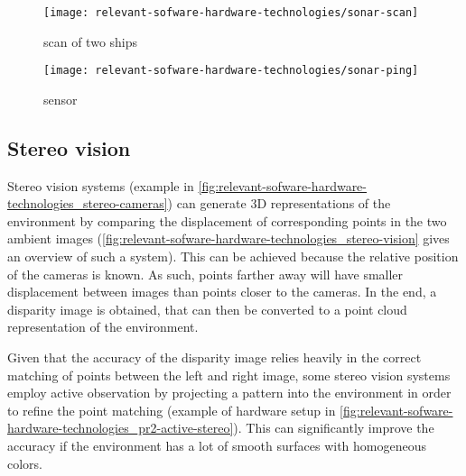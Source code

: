 \begin{savenotes}
\begin{figure}[H]
	\centering
	\begin{minipage}[h]{.47\textwidth}
		\centering
		\texttt{[image: relevant-sofware-hardware-technologies/sonar-scan]}
		\caption[ scan of two ships]{ scan of two ships\protect\footnotemark}
		\label{fig:relevant-sofware-hardware-technologies_sonar-scan}
	\end{minipage}
	\begin{minipage}[h]{.47\textwidth}
		\centering
		\texttt{[image: relevant-sofware-hardware-technologies/sonar-ping]}
		\caption[ sensor]{ sensor\protect\footnotemark}
		\label{fig:relevant-sofware-hardware-technologies_sonar-ping}
	\end{minipage}\hfill
\end{figure}
\end{savenotes}


\subsection{Stereo vision}

Stereo vision systems (example in \cref{fig:relevant-sofware-hardware-technologies_stereo-cameras}) can generate 3D representations of the environment by comparing the displacement of corresponding points in the two ambient images (\cref{fig:relevant-sofware-hardware-technologies_stereo-vision} gives an overview of such a system). This can be achieved because the relative position of the cameras is known. As such, points farther away will have smaller displacement between images than points closer to the cameras. In the end, a disparity image is obtained, that can then be converted to a point cloud representation of the environment.

Given that the accuracy of the disparity image relies heavily in the correct matching of points between the left and right image, some stereo vision systems employ active observation by projecting a pattern into the environment in order to refine the point matching (example of hardware setup in \cref{fig:relevant-sofware-hardware-technologies_pr2-active-stereo}). This can significantly improve the accuracy if the environment has a lot of smooth surfaces with homogeneous colors.


